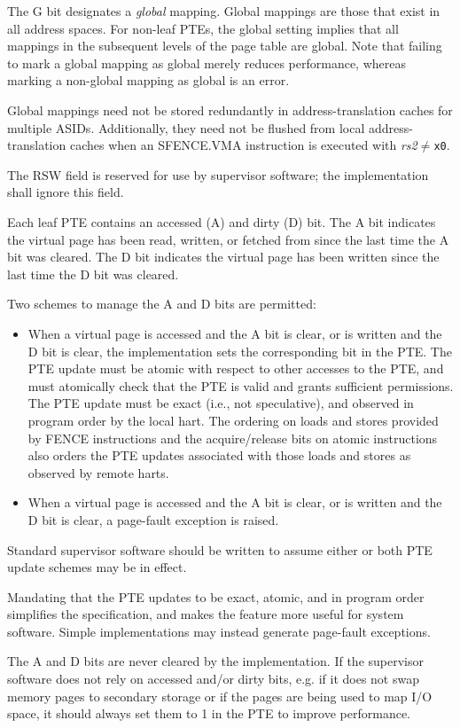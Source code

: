 The G bit designates a {\em global} mapping.  Global mappings are those that
exist in all address spaces.  For non-leaf PTEs, the global setting implies
that all mappings in the subsequent levels of the page table are global.  Note
that failing to mark a global mapping as global merely reduces performance,
whereas marking a non-global mapping as global is an error.

\begin{commentary}
Global mappings need not be stored redundantly in address-translation caches
for multiple ASIDs.  Additionally, they need not be flushed from local
address-translation caches when an SFENCE.VMA instruction is executed with
{\em rs2}$\neq${\tt x0}.
\end{commentary}

The RSW field is reserved for use by supervisor software; the implementation
shall ignore this field.

Each leaf PTE contains an accessed (A) and dirty (D) bit.  The A bit indicates
the virtual page has been read, written, or fetched from since the last time
the A bit was cleared.  The D bit indicates the virtual page has been written
since the last time the D bit was cleared.

Two schemes to manage the A and D bits are permitted:
\begin{itemize}
\item When a virtual page is accessed and the A bit is clear, or is
      written and the D bit is clear, the implementation sets the
      corresponding bit in the PTE.  The PTE update must be atomic with
      respect to other accesses to the PTE, and must atomically check
      that the PTE is valid and grants sufficient permissions.  The
      PTE update must be exact (i.e., not speculative), and observed
      in program order by the local hart. The ordering on loads and stores
      provided by FENCE instructions and the acquire/release bits on atomic
      instructions also orders the PTE updates associated with those loads
      and stores as observed by remote harts.
\item When a virtual page is accessed and the A bit is clear, or is
      written and the D bit is clear, a page-fault exception is raised.
\end{itemize}
Standard supervisor software should be written to assume either or both
PTE update schemes may be in effect.

\begin{commentary}
Mandating that the PTE updates to be exact, atomic, and in program order
simplifies the specification, and makes the feature more useful for system
software.  Simple implementations may instead generate page-fault exceptions.
  
The A and D bits are never cleared by the implementation.  If the
supervisor software does not rely on accessed and/or dirty bits,
e.g. if it does not swap memory pages to secondary storage or if the
pages are being used to map I/O space, it should always set them to 1
in the PTE to improve performance.
\end{commentary}


